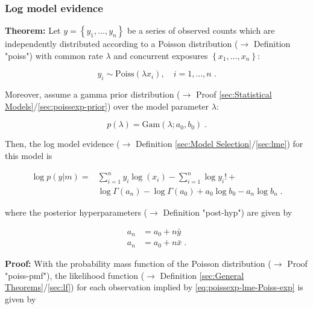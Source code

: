 \documentclass[a4paper,12pt]{book}
\begin{document}
\subsubsection[\textbf{Log model evidence}]{Log model evidence} \label{sec:poissexp-lme}

\vspace{1em}
\textbf{Theorem:} Let $y = \left\lbrace y_1, \ldots, y_n \right\rbrace$ be a series of observed counts which are independently distributed according to a Poisson distribution ($\rightarrow$ Definition "poiss") with common rate $\lambda$ and concurrent exposures $\left\lbrace x_1, \ldots, x_n \right\rbrace$:

\begin{equation} \label{eq:poissexp-lme-Poiss-exp}
y_i \sim \mathrm{Poiss}(\lambda x_i), \quad i = 1, \ldots, n \; .
\end{equation}

Moreover, assume a gamma prior distribution ($\rightarrow$ Proof \ref{sec:Statistical Models}/\ref{sec:poissexp-prior}) over the model parameter $\lambda$:

\begin{equation} \label{eq:poissexp-lme-Poiss-exp-prior}
p(\lambda) = \mathrm{Gam}(\lambda; a_0, b_0) \; .
\end{equation}

Then, the log model evidence ($\rightarrow$ Definition \ref{sec:Model Selection}/\ref{sec:lme}) for this model is

\begin{equation} \label{eq:poissexp-lme-Poiss-exp-LME}
\begin{split}
\log p(y|m) = &\sum_{i=1}^n y_i \log(x_i) - \sum_{i=1}^n \log y_i ! + \\ 
&\log \Gamma(a_n) - \log \Gamma(a_0) + a_0 \log b_0 - a_n \log b_n \; .
\end{split}
\end{equation}

where the posterior hyperparameters ($\rightarrow$ Definition "post-hyp") are given by

\begin{equation} \label{eq:poissexp-lme-Poiss-exp-post-par}
\begin{split}
a_n &= a_0 + n \bar{y} \\
a_n &= a_0 + n \bar{x} \; .
\end{split}
\end{equation}


\vspace{1em}
\textbf{Proof:} With the probability mass function of the Poisson distribution ($\rightarrow$ Proof "poiss-pmf"), the likelihood function ($\rightarrow$ Definition \ref{sec:General Theorems}/\ref{sec:lf}) for each observation implied by \eqref{eq:poissexp-lme-Poiss-exp} is given by
\end{document}
